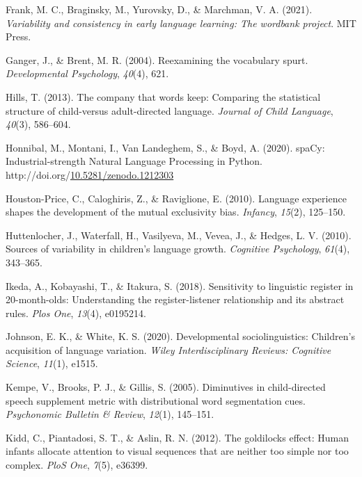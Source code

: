 \documentclass[10pt, letterpaper]{article}
\newenvironment{CSLReferences}%
  {}%
  {\par}
\begin{document}
\begin{CSLReferences}{1}{0}
\leavevmode\hypertarget{ref-frank2021variability}{}%
Frank, M. C., Braginsky, M., Yurovsky, D., \& Marchman, V. A. (2021).
\emph{Variability and consistency in early language learning: The
wordbank project}. MIT Press.

\leavevmode\hypertarget{ref-ganger2004reexamining}{}%
Ganger, J., \& Brent, M. R. (2004). Reexamining the vocabulary spurt.
\emph{Developmental Psychology}, \emph{40}(4), 621.

\leavevmode\hypertarget{ref-hills2013company}{}%
Hills, T. (2013). The company that words keep: Comparing the statistical
structure of child-versus adult-directed language. \emph{Journal of
Child Language}, \emph{40}(3), 586--604.

\leavevmode\hypertarget{ref-honnibal2020spacy}{}%
Honnibal, M., Montani, I., Van Landeghem, S., \& Boyd, A. (2020).
{spaCy: Industrial-strength Natural Language Processing in Python}.
http://doi.org/\href{https://doi.org/10.5281/zenodo.1212303}{10.5281/zenodo.1212303}

\leavevmode\hypertarget{ref-houston2010language}{}%
Houston-Price, C., Caloghiris, Z., \& Raviglione, E. (2010). Language
experience shapes the development of the mutual exclusivity bias.
\emph{Infancy}, \emph{15}(2), 125--150.

\leavevmode\hypertarget{ref-huttenlocher2010sources}{}%
Huttenlocher, J., Waterfall, H., Vasilyeva, M., Vevea, J., \& Hedges, L.
V. (2010). Sources of variability in children's language growth.
\emph{Cognitive Psychology}, \emph{61}(4), 343--365.

\leavevmode\hypertarget{ref-ikeda2018sensitivity}{}%
Ikeda, A., Kobayashi, T., \& Itakura, S. (2018). Sensitivity to
linguistic register in 20-month-olds: Understanding the
register-listener relationship and its abstract rules. \emph{Plos One},
\emph{13}(4), e0195214.

\leavevmode\hypertarget{ref-johnson2020developmental}{}%
Johnson, E. K., \& White, K. S. (2020). Developmental sociolinguistics:
Children's acquisition of language variation. \emph{Wiley
Interdisciplinary Reviews: Cognitive Science}, \emph{11}(1), e1515.

\leavevmode\hypertarget{ref-kempe2005diminutives}{}%
Kempe, V., Brooks, P. J., \& Gillis, S. (2005). Diminutives in
child-directed speech supplement metric with distributional word
segmentation cues. \emph{Psychonomic Bulletin \& Review}, \emph{12}(1),
145--151.

\leavevmode\hypertarget{ref-kidd2012goldilocks}{}%
Kidd, C., Piantadosi, S. T., \& Aslin, R. N. (2012). The goldilocks
effect: Human infants allocate attention to visual sequences that are
neither too simple nor too complex. \emph{PloS One}, \emph{7}(5),
e36399.


\end{CSLReferences}
\end{document}
